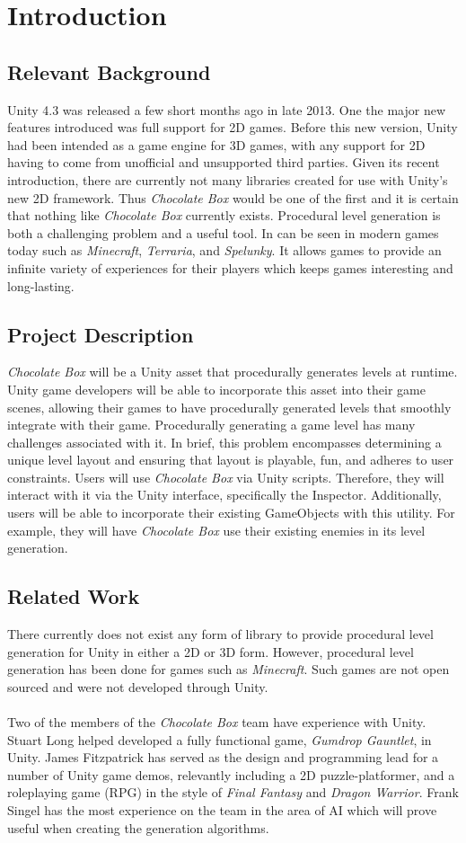 \documentclass[pdftex,12pt,letter]{article}
\begin{document}
\section{Introduction}
\subsection{Relevant Background}
Unity 4.3 was released a few short months ago in late 2013. One the major new features introduced was full support for 2D games. Before this new version, Unity had been intended as a game engine for 3D games, with any support for 2D having to come from unofficial and unsupported third parties. Given its recent introduction, there are currently not many libraries created for use with Unity's new 2D framework. Thus \textit{Chocolate Box} would be one of the first and it is certain that nothing like \textit{Chocolate Box} currently exists. Procedural level generation is both a challenging problem and a useful tool. In can be seen in modern games today such as \textit{Minecraft}, \textit{Terraria}, and \textit{Spelunky}. It allows games to provide an infinite variety of experiences for their players which keeps games interesting and long-lasting.
\subsection{Project Description}
\textit{Chocolate Box} will be a Unity asset that procedurally generates levels at runtime. Unity game developers will be able to incorporate this asset into their game scenes, allowing their games to have procedurally generated levels that smoothly integrate with their game. Procedurally generating a game level has many challenges associated with it. In brief, this problem encompasses determining a unique level layout and ensuring that layout is playable, fun, and adheres to user constraints. Users will use \textit{Chocolate Box} via Unity scripts. Therefore, they will interact with it via the Unity interface, specifically the Inspector. Additionally, users will be able to incorporate their existing GameObjects with this utility. For example, they will have \textit{Chocolate Box} use their existing enemies in its level generation.
\subsection{Related Work}
There currently does not exist any form of library to provide procedural level generation for Unity in either a 2D or 3D form. However, procedural level generation has been done for games such as \textit{Minecraft}. Such games are not open sourced and were not developed through Unity. 
\\\\
Two of the members of the \textit{Chocolate Box} team have experience with Unity. Stuart Long helped developed a fully functional game, \textit{Gumdrop Gauntlet}, in Unity. James Fitzpatrick has served as the design and programming lead for a number of Unity game demos, relevantly including a 2D puzzle-platformer, and a roleplaying game (RPG) in the style of \textit{Final Fantasy} and \textit{Dragon Warrior}. Frank Singel has the most experience on the team in the area of AI which will prove useful when creating the generation algorithms.
\end{document}
